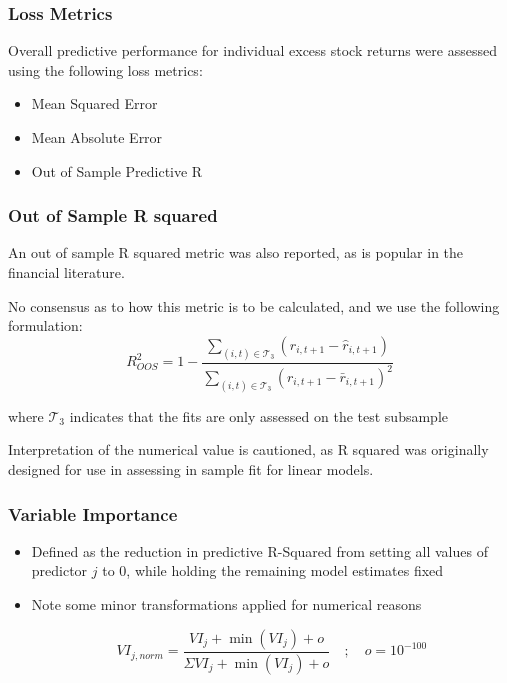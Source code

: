 \documentclass[aspectratio=169]{beamer}
\begin{document}

\begin{frame}
\frametitle{Loss Metrics}
Overall predictive performance for individual excess stock returns were assessed using the following loss metrics:
	\begin{itemize}
	\item Mean Squared Error
	\item Mean Absolute Error
	\item Out of Sample Predictive R
	\end{itemize}
\end{frame}
	
\begin{frame}
\frametitle{Out of Sample R squared}
		
An out of sample R squared metric was also reported, as is popular in the financial literature. 

No consensus as to how this metric is to be calculated, and we use the following formulation:
\begin{equation}
R^2_{OOS} = 
	1 - 
	\frac{\sum_{(i, t)\in\mathcal{T}_3}(r_{i, t+1} - \widehat{r}_{i, t+1})}
	{\sum_{(i, t)\in\mathcal{T}_3} \left( r_{i, t+1} - \bar{r}_{i, t+1} \right) ^2}
\end{equation}
		
where $\mathcal{T}_3$ indicates that the fits are only assessed on the test subsample
		
Interpretation of the numerical value is cautioned, as R squared was originally designed for use in assessing in sample fit for linear models.
\end{frame}
	
\begin{frame}
\frametitle{Variable Importance}	
\begin{itemize}
	\item Defined as the reduction in predictive R-Squared from setting all values of predictor $j$ to 0, while holding the remaining model estimates fixed
	\item Note some minor transformations applied for numerical reasons
			
	\begin{equation}
	VI_{j, norm} = \frac{VI_j + \operatorname{min}(VI_j) + o}
	{\Sigma VI_j + \operatorname{min}(VI_j) + o} \quad ; \quad o = 10^{-100}
		\end{equation}
	\end{itemize}
\end{frame}
\end{document}
